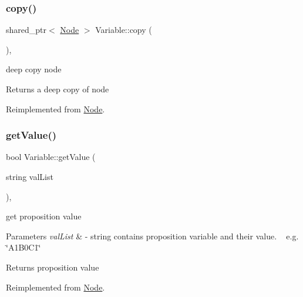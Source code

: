 \subsubsection{\texorpdfstring{copy()}{copy()}}
{\footnotesize\ttfamily shared\+\_\+ptr$<$ \hyperlink{class_node}{Node} $>$ Variable\+::copy (\begin{DoxyParamCaption}{ }\end{DoxyParamCaption})\hspace{0.3cm}{\ttfamily [override]}, {\ttfamily [virtual]}}



deep copy node 

\begin{DoxyReturn}{Returns}
a deep copy of node 
\end{DoxyReturn}


Reimplemented from \hyperlink{class_node_a0d22a418a622a24852610fd51910c5eb}{Node}.

\mbox{\label{class_variable_a2830553ab8b852a004c613a626fa6eb2}} 
\subsubsection{\texorpdfstring{get\+Value()}{getValue()}}
{\footnotesize\ttfamily bool Variable\+::get\+Value (\begin{DoxyParamCaption}\item[{string}]{val\+List }\end{DoxyParamCaption})\hspace{0.3cm}{\ttfamily [override]}, {\ttfamily [virtual]}}



get proposition value 


\begin{DoxyParams}{Parameters}
{\em val\+List} & -\/ string contains proposition variable and their value. ~\newline
 e.\+g. \char`\"{}\+A1\+B0\+C1\char`\"{} \\
\hline
\end{DoxyParams}
\begin{DoxyReturn}{Returns}
proposition value 
\end{DoxyReturn}


Reimplemented from \hyperlink{class_node_afd0c2045f3955e02e3aa1e2e987f10b2}{Node}.

\mbox{\label{class_variable_a6290fe9c9e63b4c0a980de1333902557}} 
